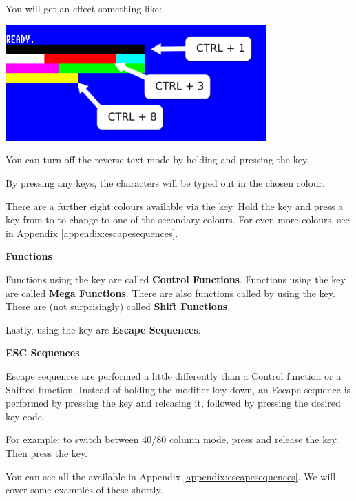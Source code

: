 \newpage

You will get an effect something like:


\begin{center}
\includegraphics[width={10cm}]{images/introduction-screen/colour-bars.png}
\end{center}


You can turn off the reverse text mode by holding  and pressing the  key.

By pressing any keys, the characters will be typed out in the chosen colour.

There are a further eight colours available via the \megasymbolkey key. Hold the \megasymbolkey key and press a key from  to  to change to one of the secondary colours. For even more colours, see  in Appendix \ref{appendix:escapesequences}.


\textbf{Functions}

Functions using the  key are called \textbf{Control Functions}.
Functions using the \megasymbolkey key are called \textbf{Mega Functions}. There are also functions called by using the  key. These are (not surprisingly) called \textbf{Shift Functions}.

Lastly, using the  key are \textbf{Escape Sequences}.

\textbf{ESC Sequences}

Escape sequences are performed a little differently than a Control function or a Shifted function. Instead of holding the modifier key down, an Escape sequence is performed by pressing the  key and releasing it, followed by pressing the desired key code.

For example: to switch between 40/80 column mode, press and release the  key. Then press the  key.

You can see all the available  in Appendix \ref{appendix:escapesequences}. We will cover some examples of these shortly.

